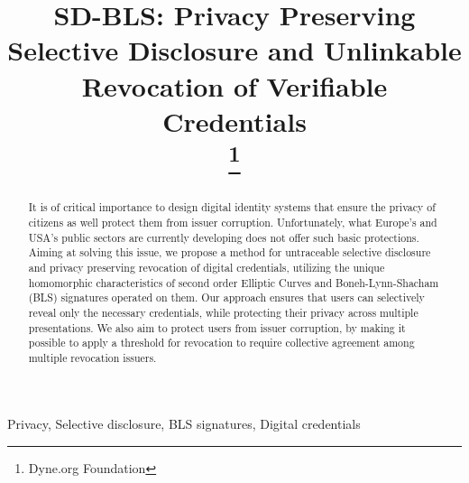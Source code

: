 \documentclass[conference]{IEEEtran}
\begin{document}
\title{SD-BLS: Privacy Preserving Selective Disclosure and Unlinkable Revocation of Verifiable Credentials\\
\thanks{Dyne.org Foundation}
}

\author{
\and
{}
\and
{}
}

\maketitle

\begin{abstract}

It is of critical importance to design digital identity systems that
ensure the privacy of citizens as well protect them from issuer
corruption. Unfortunately, what Europe's and USA's public sectors are
currently developing does not offer such basic protections. Aiming at solving this issue, we propose a method for untraceable selective disclosure and privacy preserving revocation of digital credentials, utilizing
the unique homomorphic characteristics of second order Elliptic Curves
and Boneh-Lynn-Shacham (BLS) signatures operated on them. Our approach
ensures that users can selectively reveal only the necessary
credentials, while protecting their privacy across multiple
presentations.  We also aim to protect users from issuer corruption, by making it possible to apply a threshold for revocation to require collective agreement among multiple revocation issuers.

\end{abstract}

\begin{IEEEkeywords}
Privacy, Selective disclosure, BLS signatures, Digital credentials
\end{IEEEkeywords}
\end{document}
